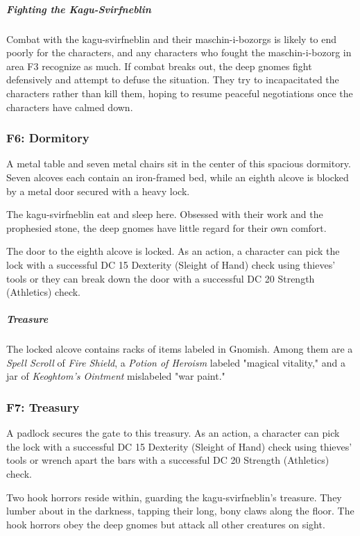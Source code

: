 \documentclass[10pt,a4paper,twoside,bg=print,twocolumn,openany,nodeprecatedcode]{dndbook}
\begin{document}
\subparagraph{Fighting the Kagu-Svirfneblin}
Combat with the kagu-svirfneblin and their maschin-i-bozorgs is likely to end poorly for the characters, and any characters who fought the maschin-i-bozorg in area F3 recognize as much. If combat breaks out, the deep gnomes fight defensively and attempt to defuse the situation. They try to incapacitated the characters rather than kill them, hoping to resume peaceful negotiations once the characters have calmed down.

\subsubsection{F6: Dormitory}
\begin{DndReadAloud}{}
A metal table and seven metal chairs sit in the center of this spacious dormitory. Seven alcoves each contain an iron-framed bed, while an eighth alcove is blocked by a metal door secured with a heavy lock.

\end{DndReadAloud}

The kagu-svirfneblin eat and sleep here. Obsessed with their work and the prophesied stone, the deep gnomes have little regard for their own comfort.

The door to the eighth alcove is locked. As an action, a character can pick the lock with a successful DC 15 Dexterity (Sleight of Hand) check using thieves' tools or they can break down the door with a successful DC 20 Strength (Athletics) check.

\subparagraph{Treasure}
The locked alcove contains racks of items labeled in Gnomish. Among them are a \textit{Spell Scroll} of \textit{Fire Shield}, a \textit{Potion of Heroism} labeled "magical vitality," and a jar of \textit{Keoghtom's Ointment} mislabeled "war paint."

\subsubsection{F7: Treasury}
A padlock secures the gate to this treasury. As an action, a character can pick the lock with a successful DC 15 Dexterity (Sleight of Hand) check using thieves' tools or wrench apart the bars with a successful DC 20 Strength (Athletics) check.

Two hook horrors reside within, guarding the kagu-svirfneblin's treasure. They lumber about in the darkness, tapping their long, bony claws along the floor. The hook horrors obey the deep gnomes but attack all other creatures on sight.
\end{document}

